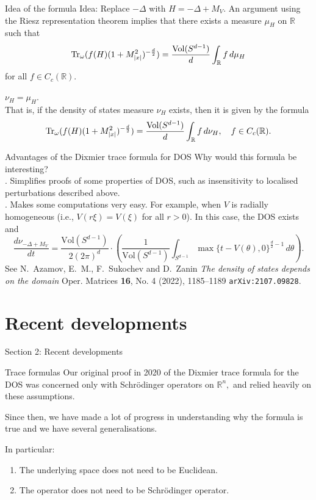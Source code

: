 \documentclass{beamer}
\numberwithin{equation}{section}
\theoremstyle{plain}
\theoremstyle{plain}
\theoremstyle{definition}
\theoremstyle{plain}
\theoremstyle{plain}
\theoremstyle{definition}
\newcommand{\tr}{{\rm Tr}}
\newcommand{\Vol}{\mathrm{Vol}}
\newcommand{\Rl}{\mathbb{R}}
\begin{document}
\begin{frame}{Idea of the formula}
    Idea: Replace $-\Delta$ with $H = -\Delta+M_V$. An argument using the Riesz representation theorem implies that there exists a measure $\mu_H$ on $\Rl$ such that 
    $$
        \tr_{\omega}(f(H)(1+M_{|x|}^2)^{-\frac{d}{2}}) = \frac{\Vol(S^{d-1})}{d}\int_{\Rl} f\,d\mu_H
    $$
    for all $f \in C_c(\Rl).$\\
    
    \begin{theorem}
        $\nu_H = \mu_H$.\\
        
        That is, if the density of states measure $\nu_H$ exists, then it is given by the formula
        $$
            \tr_{\omega}(f(H)(1+M_{|x|}^2)^{-\frac{d}{2}}) = \frac{\Vol(S^{d-1})}{d}\int_{\Rl} f\,d\nu_H,\quad f \in C_c(\Rl).
        $$
    \end{theorem}
\end{frame} 


\begin{frame}{Advantages of the Dixmier trace formula for DOS}
Why would this formula be interesting?\\ . Simplifies proofs of some properties of DOS, such as insensitivity to localised perturbations described above.\\
. Makes some computations very easy. For example, when $V$ is radially homogeneous (i.e., $V(r\xi) = V(\xi)$ for all $r>0$). In this case, the DOS exists and
    \[
        \frac{d\nu_{-\Delta+M_V}}{dt} = \frac{\Vol(S^{d-1})}{2(2\pi)^d}\cdot \left(\frac{1}{\mathrm{Vol}(S^{d-1})}\int_{S^{d-1}} \max\{t-V(\theta),0\}^{\frac{d}{2}-1}\,d\theta\right).
    \]
    See N.~Azamov, E.~M., F.~Sukochev and D.~Zanin \emph{The density of states depends on the domain} Oper. Matrices \textbf{16}, No. 4 (2022), 1185--1189 \texttt{arXiv:2107.09828}.
\end{frame}


\section{Recent developments}
\begin{frame}
    \huge{Section 2: Recent developments}
\end{frame}


\begin{frame}{Trace formulas}
    Our original proof in 2020 of the Dixmier trace formula for the DOS was concerned only with Schr\"odinger operators on $\Rl^n,$ and relied heavily on these assumptions.\pause

    Since then, we have made a lot of progress in understanding why the formula is true and we have several generalisations.\pause

    In particular:
    \begin{enumerate}
        \item{} The underlying space does not need to be Euclidean.\pause
        \item{} The operator does not need to be Schr\"odinger operator.
    \end{enumerate}

\end{frame}
    
\end{document}
